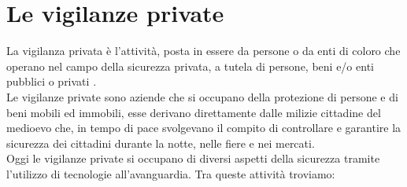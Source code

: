 \section{Le vigilanze private}
La vigilanza privata è l'attività, posta in essere da persone o da enti di coloro che operano nel campo della sicurezza privata, a tutela di persone, beni e/o enti pubblici o privati \cite{wiki:vigilanza}.\\
Le vigilanze private sono aziende che si occupano della protezione di persone e di beni mobili ed immobili, esse derivano direttamente dalle milizie cittadine del medioevo che, in tempo di pace svolgevano il compito di controllare e garantire la sicurezza dei cittadini durante la notte, nelle fiere e nei mercati.\\
Oggi le vigilanze private si occupano di diversi aspetti della sicurezza tramite l'utilizzo di tecnologie all'avanguardia. Tra queste attività troviamo:
